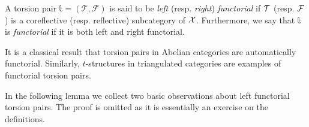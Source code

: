 \begin{definition}
A torsion pair $\mathbb{t}=(\mathcal{T},\mathcal{F})$  is said to be {\em left} (resp. {\em right}) {\em functorial} if $\mathcal T$ (resp. $\mathcal F$) is a coreflective (resp. reflective) subcategory of $\mathcal X$. 
%
Furthermore, we say that $\mathbb{t}$ is {\em functorial} if it is both left and right functorial.
\end{definition}

It is a classical result that torsion pairs in Abelian categories are automatically functorial. Similarly, $t$-structures in triangulated categories are examples of functorial torsion pairs. 
  
In the following lemma we collect two basic observations about left functorial torsion pairs. The proof is omitted as it is essentially an exercise on the definitions.

